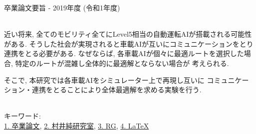 卒業論文要旨 - 2019年度 (令和1年度)
\begin{center}
\begin{large}
\end{large}
\end{center}

~ \\

近い将来, 全てのモビリティ全てにLevel5相当の自動運転AIが搭載される可能性がある. 
そうした社会が実現されると車載AIが互いにコミュニケーションをとり連携をとる必要がある.
なぜならば, 各車載AIが個々に最適ルートを選択した場合, 特定のルートが混雑し全体的に最適解とならない場合が
考えられる.

そこで, 本研究では各車載AIをシミュレーター上で再現し互いに
コミュニケーション・連携をとることにより全体最適解を求める実験を行う.


~ \\
キーワード:\\
\underline{1. 卒業論文},
\underline{2. 村井純研究室},
\underline{3. RG},
\underline{4. LaTeX}
\begin{flushright}
\dept \\
\author
\end{flushright}
